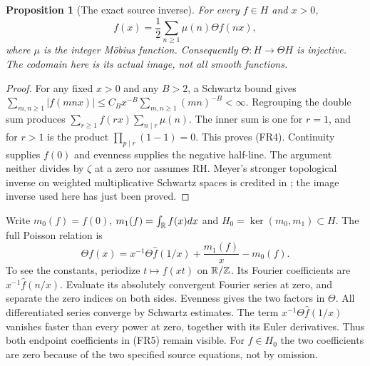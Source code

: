 \documentclass[11pt]{article}
\newtheorem{proposition}[theorem]{Proposition}
\newcommand{\Z}{\mathbb Z}\newcommand{\Q}{\mathbb Q}
\begin{document}
\begin{proposition}[The exact source inverse]
For every $f\in H$ and $x>0$,
\begin{equation}
 f(x)=\frac12\sum_{n\geq1}\mu(n)\Theta f(nx),
 \tag{FR4}
\end{equation}
where $\mu$ is the integer M\"obius function. Consequently $\Theta:H\to\Theta H$ is injective. The codomain here is its actual image, not all smooth functions.
\end{proposition}
\begin{proof}
For any fixed $x>0$ and any $B>2$, a Schwartz bound gives
$\sum_{m,n\geq1}|f(mnx)|\leq C_Bx^{-B}\sum_{m,n\geq1}(mn)^{-B}<\infty$.
Regrouping the double sum produces $\sum_{r\geq1}f(rx)\sum_{n\mid r}\mu(n)$.
The inner sum is one for $r=1$, and for $r>1$ is the product $\prod_{p\mid r}(1-1)=0$.
This proves (FR4). Continuity supplies $f(0)$ and evenness supplies the negative half-line. The argument neither divides by $\zeta$ at a zero nor assumes RH. Meyer's stronger topological inverse on weighted multiplicative Schwartz spaces is credited in \cite[\texttt{pro:Z\_invertible}]{Meyer}; the image inverse used here has just been proved.
\end{proof}

Write $m_0(f)=f(0)$, $m_1(f)=\int_\mathbb R f(x)dx$ and
$H_0=\ker(m_0,m_1)\subset H$. The full Poisson relation is
\begin{equation}
 \Theta f(x)=x^{-1}\Theta\widehat f(1/x)+\frac{m_1(f)}x-m_0(f).
 \tag{FR5}
\end{equation}
To see the constants, periodize $t\mapsto f(xt)$ on $\R/\Z$. Its Fourier coefficients are $x^{-1}\widehat f(n/x)$. Evaluate its absolutely convergent Fourier series at zero, and separate the zero indices on both sides. Evenness gives the two factors in $\Theta$. All differentiated series converge by Schwartz estimates. The term $x^{-1}\Theta\widehat f(1/x)$ vanishes faster than every power at zero, together with its Euler derivatives. Thus both endpoint coefficients in (FR5) remain visible. For $f\in H_0$ the two coefficients are zero because of the two specified source equations, not by omission.
\end{document}
